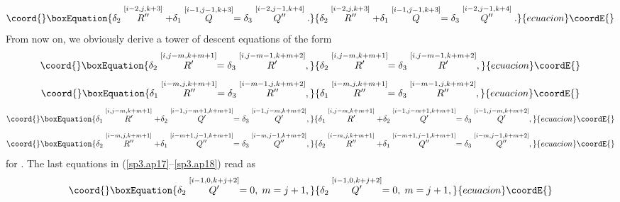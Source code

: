 \documentclass[a4paper,12pt]{article}
\begin{document}
\begin{equation}\coord{}\boxEquation{
\delta _{2}\stackrel{[i-2,j,k+3]}{R^{\prime \prime }}+\delta _{1}\stackrel{
[i-1,j-1,k+3]}{Q}=\delta _{3}\stackrel{[i-2,j-1,k+4]}{Q^{\prime \prime }}.
\label{sp3.ap14}
}{
\delta _{2}\stackrel{[i-2,j,k+3]}{R^{\prime \prime }}+\delta _{1}\stackrel{
[i-1,j-1,k+3]}{Q}=\delta _{3}\stackrel{[i-2,j-1,k+4]}{Q^{\prime \prime }}.
}{ecuacion}\coordE{}\end{equation}
From now on, we obviously derive a tower of descent equations of the form 
\begin{equation}\coord{}\boxEquation{
\delta _{2}\stackrel{[i,j-m,k+m+1]}{R^{\prime }}=\delta _{3}\stackrel{
[i,j-m-1,k+m+2]}{R^{\prime }},  \label{sp3.ap15}
}{
\delta _{2}\stackrel{[i,j-m,k+m+1]}{R^{\prime }}=\delta _{3}\stackrel{
[i,j-m-1,k+m+2]}{R^{\prime }},  }{ecuacion}\coordE{}\end{equation}
\begin{equation}\coord{}\boxEquation{
\delta _{1}\stackrel{[i-m,j,k+m+1]}{R^{\prime \prime }}=\delta _{3}\stackrel{
[i-m-1,j,k+m+2]}{R^{\prime \prime }},  \label{sp3.ap16}
}{
\delta _{1}\stackrel{[i-m,j,k+m+1]}{R^{\prime \prime }}=\delta _{3}\stackrel{
[i-m-1,j,k+m+2]}{R^{\prime \prime }},  }{ecuacion}\coordE{}\end{equation}
\begin{equation}\coord{}\boxEquation{
\delta _{1}\stackrel{[i,j-m,k+m+1]}{R^{\prime }}+\delta _{2}\stackrel{
[i-1,j-m+1,k+m+1]}{Q^{\prime }}=\delta _{3}\stackrel{[i-1,j-m,k+m+2]}{
Q^{\prime }},  \label{sp3.ap17}
}{
\delta _{1}\stackrel{[i,j-m,k+m+1]}{R^{\prime }}+\delta _{2}\stackrel{
[i-1,j-m+1,k+m+1]}{Q^{\prime }}=\delta _{3}\stackrel{[i-1,j-m,k+m+2]}{
Q^{\prime }},  }{ecuacion}\coordE{}\end{equation}
\begin{equation}\coord{}\boxEquation{
\delta _{2}\stackrel{[i-m,j,k+m+1]}{R^{\prime \prime }}+\delta _{1}\stackrel{
[i-m+1,j-1,k+m+1]}{Q^{\prime \prime }}=\delta _{3}\stackrel{[i-m,j-1,k+m+2]}{
Q^{\prime \prime }},  \label{sp3.ap18}
}{
\delta _{2}\stackrel{[i-m,j,k+m+1]}{R^{\prime \prime }}+\delta _{1}\stackrel{
[i-m+1,j-1,k+m+1]}{Q^{\prime \prime }}=\delta _{3}\stackrel{[i-m,j-1,k+m+2]}{
Q^{\prime \prime }},  }{ecuacion}\coordE{}\end{equation}
for \coordHE{}. The last equations in (\ref{sp3.ap17}--\ref{sp3.ap18}) read
as 
\begin{equation}\coord{}\boxEquation{
\delta _{2}\stackrel{[i-1,0,k+j+2]}{Q^{\prime }}=0,\;m=j+1,  \label{sp3.ap19}
}{
\delta _{2}\stackrel{[i-1,0,k+j+2]}{Q^{\prime }}=0,\;m=j+1,  }{ecuacion}\coordE{}\end{equation}
\end{document}

